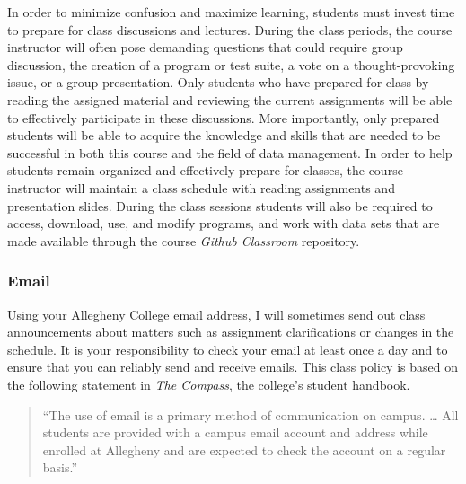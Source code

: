 \documentclass[11pt]{article} %
\begin{document}
% 

\noindent In order to minimize confusion and maximize learning, students must invest time to prepare for class discussions and lectures.  During the class periods, the course instructor will often pose demanding questions that could require group discussion, the creation of a program or test suite, a vote on a thought-provoking issue, or a group presentation.  Only students who have prepared for class by reading the assigned material and reviewing the current assignments will be able to effectively participate in these discussions.  More importantly, only prepared students will be able to acquire the knowledge and skills that are needed to be successful in both this course and the field of data management.  In order to help students remain organized and effectively prepare for classes, the course instructor will maintain a class schedule with reading assignments and presentation slides.   During the class sessions students will also be required to access, download, use, and modify programs, and work with data sets that are made available through the course {\em Github Classroom} repository. %

\subsubsection*{\textbf{Email}}

Using your Allegheny College email address, I will sometimes send out class announcements about matters such as assignment clarifications or changes in the schedule. It is your responsibility to check your email at least once a day and to ensure that you can reliably send and receive emails. This class policy is based on the following statement in {\em The Compass}, the college's student handbook.

\vspace*{-.1in}
\begin{quote}
  ``The use of email is a primary method of communication on campus. \ldots
  All students are provided with a campus email account and address while
  enrolled at Allegheny and are expected to check the account on a regular
  basis.'' 
\end{quote}
\vspace*{-.1in}
\end{document}
